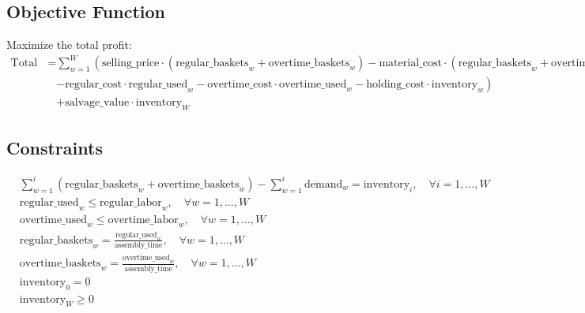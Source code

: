 \documentclass{article}
\begin{document}
\subsection*{Objective Function}
Maximize the total profit:
\begin{align*}
    \text{Total Profit} = & \sum_{w=1}^{W} \left( \text{selling\_price} \cdot (\text{regular\_baskets}_w + \text{overtime\_baskets}_w) - \text{material\_cost} \cdot (\text{regular\_baskets}_w + \text{overtime\_baskets}_w) \right. \\
    & \left. - \text{regular\_cost} \cdot \text{regular\_used}_w - \text{overtime\_cost} \cdot \text{overtime\_used}_w - \text{holding\_cost} \cdot \text{inventory}_w \right) \\
    & + \text{salvage\_value} \cdot \text{inventory}_W
\end{align*}

\subsection*{Constraints}
\begin{align*}
    & \sum_{w=1}^{i} (\text{regular\_baskets}_w + \text{overtime\_baskets}_w) - \sum_{w=1}^{i} \text{demand}_w = \text{inventory}_i, \quad \forall i = 1, \ldots, W \\
    & \text{regular\_used}_w \leq \text{regular\_labor}_w, \quad \forall w = 1, \ldots, W \\
    & \text{overtime\_used}_w \leq \text{overtime\_labor}_w, \quad \forall w = 1, \ldots, W \\
    & \text{regular\_baskets}_w = \frac{\text{regular\_used}_w}{\text{assembly\_time}}, \quad \forall w = 1, \ldots, W \\
    & \text{overtime\_baskets}_w = \frac{\text{overtime\_used}_w}{\text{assembly\_time}}, \quad \forall w = 1, \ldots, W \\
    & \text{inventory}_0 = 0 \\
    & \text{inventory}_W \geq 0 \\
\end{align*}
\end{document}

